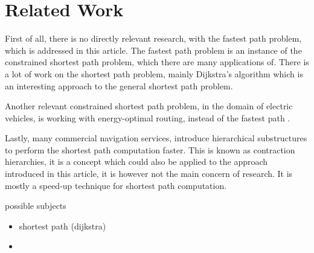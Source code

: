 \section{Related Work}\label{sec:relatedwork}
First of all, there is no directly relevant research, with the fastest path problem, which is addressed in this article. The fastest path problem is an instance of the constrained shortest path problem, which there are many applications of. There is a lot of work on the shortest path problem, mainly Dijkstra's algorithm \cite{dijkstra1959note} which is an interesting approach to the general shortest path problem.

Another relevant constrained shortest path problem, in the domain of electric vehicles, is working with energy-optimal routing, instead of the fastest path \cite{artmeier2010shortest}.

Lastly, many commercial navigation services, introduce hierarchical substructures to perform the shortest path computation faster. This is known as contraction hierarchies, it is a concept which could also be applied to the approach introduced in this article, it is however not the main concern of research. It is mostly a speed-up technique for shortest path computation.




possible subjects
\begin{itemize}
    \item shortest path (dijkstra)
    \item 
\end{itemize}
